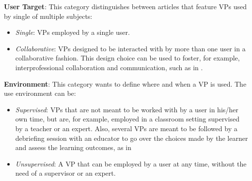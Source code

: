 

\item \textbf{User Target}: This category distinguishes between articles that feature VPs used by single of multiple subjects:
    \begin{itemize}
        \item \emph{Single}: VPs employed by a single user. 
        \item \emph{Collaborative}: VPs designed to be interacted with by more than one user in a collaborative fashion. This design choice can be used to foster, for example, interprofessional collaboration and communication, such as in \cite{adefila2020students}. 
    \end{itemize}
    
    \textbf{Environment}: This category wants to define where and when a VP is used. The use environment can be:
    \begin{itemize}

    \item \emph{Supervised}: VPs that are not meant to be worked with by a user in his/her own time, but are, for example, employed in a classroom setting supervised by a teacher or an expert. Also, several VPs are meant to be followed by a debriefing session with an educator to go over the choices made by the learner and assess the learning outcomes, as in 
    \item \emph{Unsupervised}: A VP that can be employed by a user at any time, without the need of a supervisor or an expert.
    \end{itemize}
    
